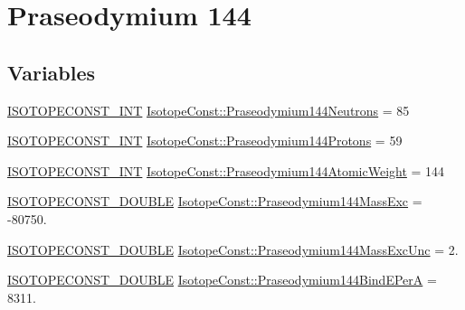 \hypertarget{group___isotope_const-_praseodymium-_pr144}{}\section{Praseodymium 144}
\label{group___isotope_const-_praseodymium-_pr144}
\subsection*{Variables}
\begin{DoxyCompactItemize}
\item 
\mbox{\hyperlink{group___isotope_const-_macros_ga5f18360b3e99483a35c32d789e62621c}{I\+S\+O\+T\+O\+P\+E\+C\+O\+N\+S\+T\+\_\+\+I\+NT}} \mbox{\hyperlink{group___isotope_const-_praseodymium-_pr144_ga356aa60580b723d73c76f2e5253979c6}{Isotope\+Const\+::\+Praseodymium144\+Neutrons}} = 85
\item 
\mbox{\hyperlink{group___isotope_const-_macros_ga5f18360b3e99483a35c32d789e62621c}{I\+S\+O\+T\+O\+P\+E\+C\+O\+N\+S\+T\+\_\+\+I\+NT}} \mbox{\hyperlink{group___isotope_const-_praseodymium-_pr144_ga0458982aed921161774956717840134d}{Isotope\+Const\+::\+Praseodymium144\+Protons}} = 59
\item 
\mbox{\hyperlink{group___isotope_const-_macros_ga5f18360b3e99483a35c32d789e62621c}{I\+S\+O\+T\+O\+P\+E\+C\+O\+N\+S\+T\+\_\+\+I\+NT}} \mbox{\hyperlink{group___isotope_const-_praseodymium-_pr144_gad3cda3942d553b9290f0697bbf187dae}{Isotope\+Const\+::\+Praseodymium144\+Atomic\+Weight}} = 144
\item 
\mbox{\hyperlink{group___isotope_const-_macros_ga8f45a7272ce02c0b4c65c44636ed719a}{I\+S\+O\+T\+O\+P\+E\+C\+O\+N\+S\+T\+\_\+\+D\+O\+U\+B\+LE}} \mbox{\hyperlink{group___isotope_const-_praseodymium-_pr144_ga8350769fbf9ff0af71de18d80c31a619}{Isotope\+Const\+::\+Praseodymium144\+Mass\+Exc}} = -\/80750.
\item 
\mbox{\hyperlink{group___isotope_const-_macros_ga8f45a7272ce02c0b4c65c44636ed719a}{I\+S\+O\+T\+O\+P\+E\+C\+O\+N\+S\+T\+\_\+\+D\+O\+U\+B\+LE}} \mbox{\hyperlink{group___isotope_const-_praseodymium-_pr144_ga58986b6a2c0d650c6aa2df55ce295ff9}{Isotope\+Const\+::\+Praseodymium144\+Mass\+Exc\+Unc}} = 2.
\item 
\mbox{\hyperlink{group___isotope_const-_macros_ga8f45a7272ce02c0b4c65c44636ed719a}{I\+S\+O\+T\+O\+P\+E\+C\+O\+N\+S\+T\+\_\+\+D\+O\+U\+B\+LE}} \mbox{\hyperlink{group___isotope_const-_praseodymium-_pr144_ga862854b39c067065a807a1b33b38b778}{Isotope\+Const\+::\+Praseodymium144\+Bind\+E\+PerA}} = 8311.

\end{DoxyCompactItemize}
